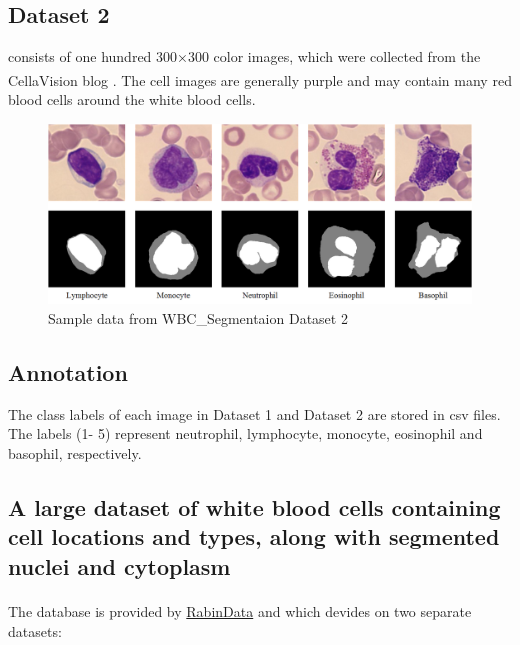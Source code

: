 \subsection{Dataset 2}
consists of one hundred 300×300 color images, which were collected from the CellaVision blog \textsuperscript{\cite{2022_cellavision}}. The cell images are generally purple and may contain many red blood cells around the white blood cells.

\begin{figure}[H]
\centering
\includegraphics[width=\linewidth]{../images/WBC_Dataset2.png}
\caption{Sample data from WBC\_Segmentaion Dataset 2}
\label{fig:WBC_Dataset2_sample}
\end{figure}


\subsection{Annotation}
The class labels of each image in Dataset 1 and Dataset 2 are stored in csv files. The labels (1- 5) represent neutrophil, lymphocyte, monocyte, eosinophil and basophil, respectively.


\subsection{A large dataset of white blood cells containing cell locations and types, along with segmented nuclei and cytoplasm}

The database is provided by \href{https://raabindata.com/free-data/#double-labeled-cropped-cells}{RabinData} and \textsuperscript{\cite{Kouzehkanan2022}} which devides on two separate datasets:
